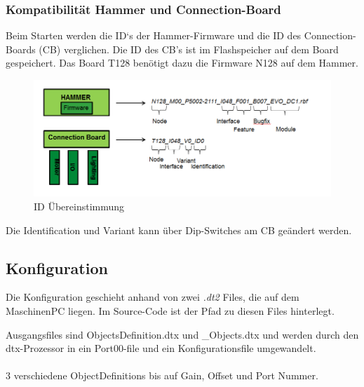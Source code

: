 		\subsubsection{Kompatibilität Hammer und Connection-Board}
			Beim Starten werden die ID`s der Hammer-Firmware und die ID des Connection-Boards (CB) verglichen. Die ID des CB's ist im Flashspeicher auf dem Board gespeichert. Das Board T128 benötigt dazu die Firmware N128 auf dem Hammer. 
			\begin{figure}[h!]
				\centering
				\includegraphics[width=0.8\linewidth]{./pics/ccp/connectionboard.png}
				\caption{ID Übereinstimmung}
			\end{figure}
			Die Identification und Variant kann über Dip-Switches am CB geändert werden. 
		
	\subsection{Konfiguration}
		Die Konfiguration geschieht anhand von zwei \textit{.dt2} Files, die auf dem MaschinenPC liegen. Im Source-Code ist der Pfad zu diesen Files hinterlegt. 




		Ausgangsfiles sind ObjectsDefinition.dtx und \_Objects.dtx und werden durch den dtx-Prozessor in ein Port00-file und ein Konfigurationsfile umgewandelt.
		\\\\
		3 verschiedene ObjectDefinitions bis auf Gain, Offset und Port Nummer.
		\\\\